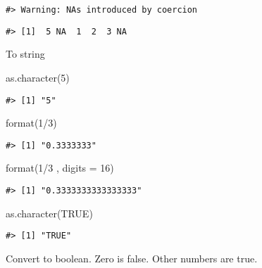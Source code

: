 \documentclass[
]{book}
\newenvironment{Shaded}{\begin{snugshade}}{\end{snugshade}}
\newcommand{\AttributeTok}[1]{\textcolor[rgb]{0.77,0.63,0.00}{#1}}
\newcommand{\ConstantTok}[1]{\textcolor[rgb]{0.00,0.00,0.00}{#1}}
\newcommand{\DecValTok}[1]{\textcolor[rgb]{0.00,0.00,0.81}{#1}}
\newcommand{\FunctionTok}[1]{\textcolor[rgb]{0.00,0.00,0.00}{#1}}
\newcommand{\NormalTok}[1]{#1}
\newcommand{\SpecialCharTok}[1]{\textcolor[rgb]{0.00,0.00,0.00}{#1}}
\begin{document}
\begin{verbatim}
#> Warning: NAs introduced by coercion
\end{verbatim}

\begin{verbatim}
#> [1]  5 NA  1  2  3 NA
\end{verbatim}

To string

\begin{Shaded}
\begin{Highlighting}[]
\FunctionTok{as.character}\NormalTok{(}\DecValTok{5}\NormalTok{)}
\end{Highlighting}
\end{Shaded}

\begin{verbatim}
#> [1] "5"
\end{verbatim}

\begin{Shaded}
\begin{Highlighting}[]
\FunctionTok{format}\NormalTok{(}\DecValTok{1}\SpecialCharTok{/}\DecValTok{3}\NormalTok{)}
\end{Highlighting}
\end{Shaded}

\begin{verbatim}
#> [1] "0.3333333"
\end{verbatim}

\begin{Shaded}
\begin{Highlighting}[]
\FunctionTok{format}\NormalTok{(}\DecValTok{1}\SpecialCharTok{/}\DecValTok{3}\NormalTok{ , }\AttributeTok{digits =} \DecValTok{16}\NormalTok{)}
\end{Highlighting}
\end{Shaded}

\begin{verbatim}
#> [1] "0.3333333333333333"
\end{verbatim}

\begin{Shaded}
\begin{Highlighting}[]
\FunctionTok{as.character}\NormalTok{(}\ConstantTok{TRUE}\NormalTok{)}
\end{Highlighting}
\end{Shaded}

\begin{verbatim}
#> [1] "TRUE"
\end{verbatim}

Convert to boolean. Zero is false. Other numbers are true.
\end{document}

